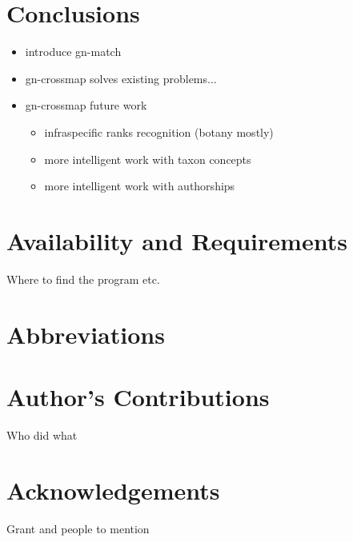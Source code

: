 \documentclass{bmcart}
\begin{document}
\section*{Conclusions}
\begin{itemize}
  \item introduce gn-match
  \item gn-crossmap solves existing problems...
  \item gn-crossmap future work
    \begin{itemize}
      \item infraspecific ranks recognition (botany mostly)
      \item more intelligent work with taxon concepts
      \item more intelligent work with authorships
    \end{itemize}
\end{itemize}

\section*{Availability and Requirements}

Where to find the program etc.

\section*{Abbreviations}


\section*{Author's Contributions}

Who did what

\section*{Acknowledgements}

Grant and people to mention



\end{document}
